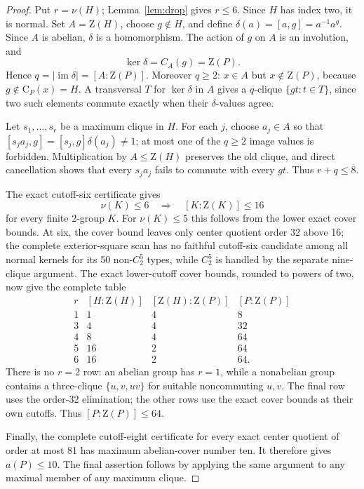 \documentclass[11pt]{article}
\theoremstyle{remark}
\newcommand{\nuG}{\nu}
\newcommand{\aG}{a}
\newcommand{\Z}{\mathrm Z}
\newcommand{\CG}{\mathrm C}
\begin{document}
\begin{proof}
Put $r=\nuG(H)$; Lemma~\ref{lem:drop} gives $r\le6$.  Since $H$ has index
two, it is normal.  Set $A=\Z(H)$, choose $g\notin H$, and define
$\delta(a)=[a,g]=a^{-1}a^g$.  Since $A$ is abelian, $\delta$ is a
homomorphism.  The action of $g$ on $A$ is an involution, and
\[
 \ker\delta=C_A(g)=\Z(P).
\]
Hence $q=|\operatorname{im}\delta|=[A:\Z(P)]$.  Moreover $q\ge2$:
$x\in A$ but $x\notin\Z(P)$, because $g\notin\CG_P(x)=H$.  A transversal $T$ for
$\ker\delta$ in $A$ gives a $q$-clique $\{gt:t\in T\}$, since two such
elements commute exactly when their $\delta$-values agree.

Let $s_1,\ldots,s_r$ be a maximum clique in $H$.  For each $j$, choose
$a_j\in A$ so that $[s_ja_j,g]=[s_j,g]\delta(a_j)\ne1$; at most one of the
$q\ge2$ image values is forbidden.  Multiplication by $A\le\Z(H)$ preserves
the old clique, and direct cancellation shows that every $s_ja_j$ fails to
commute with every $gt$.  Thus $r+q\le8$.

The exact cutoff-six certificate gives
\[
 \nuG(K)\le6\quad\Longrightarrow\quad[K:\Z(K)]\le16
\]
for every finite $2$-group $K$.  For $\nuG(K)\le5$ this follows from the
lower exact cover bounds.  At six, the cover bound leaves only center
quotient order 32 above 16; the complete exterior-square scan has no
faithful cutoff-six candidate among all normal kernels for its 50
non-$C_2^5$ types, while $C_2^5$ is handled by the separate nine-clique
argument.  The exact lower-cutoff cover bounds,
rounded to powers of two, now give the complete table
\[
\begin{array}{c|cc|c}
r&[H:\Z(H)]&[\Z(H):\Z(P)]&[P:\Z(P)]\\ \hline
1&1&4&8\\
3&4&4&32\\
4&8&4&64\\
5&16&2&64\\
6&16&2&64.
\end{array}
\]
There is no $r=2$ row: an abelian group has $r=1$, while a nonabelian group
contains a three-clique $\{u,v,uv\}$ for suitable noncommuting $u,v$.
The final row uses the order-32 elimination; the other rows use the exact
cover bounds at their own cutoffs.  Thus $[P:\Z(P)]\le64$.

Finally, the complete cutoff-eight certificate for every exact center
quotient of order at most 81 has maximum abelian-cover number ten.  It
therefore gives $\aG(P)\le10$.  The final assertion follows by applying the
same argument to any maximal member of any maximum clique.
\end{proof}
\end{document}

